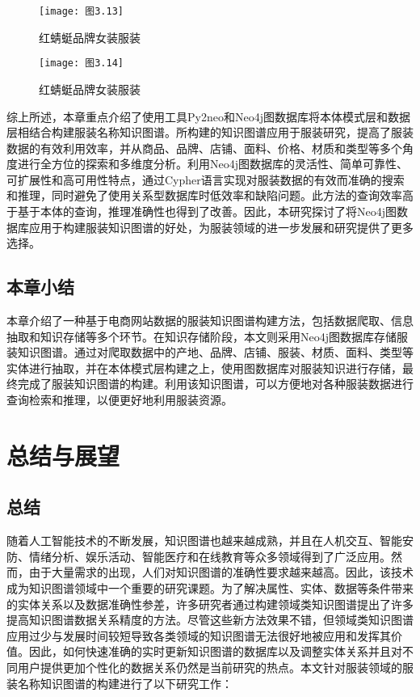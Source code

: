 \documentclass[bachelor_p]{hdu-thesis}
\begin{document}
\begin{figure}[h]
  \centering
  \texttt{[image: 图3.13]}
  \caption{红蜻蜓品牌女装服装}\label{fig:graph.313}
\end{figure}

\begin{figure}[h]
  \centering
  \texttt{[image: 图3.14]}
  \caption{红蜻蜓品牌女装服装}\label{fig:graph.314}
\end{figure}

综上所述，本章重点介绍了使用工具Py2neo和Neo4j图数据库将本体模式层和数据层相结合构建服装名称知识图谱。所构建的知识图谱应用于服装研究，提高了服装数据的有效利用效率，并从商品、品牌、店铺、面料、价格、材质和类型等多个角度进行全方位的探索和多维度分析。利用Neo4j图数据库的灵活性、简单可靠性、可扩展性和高可用性特点，通过Cypher语言实现对服装数据的有效而准确的搜索和推理，同时避免了使用关系型数据库时低效率和缺陷问题。此方法的查询效率高于基于本体的查询，推理准确性也得到了改善。因此，本研究探讨了将Neo4j图数据库应用于构建服装知识图谱的好处，为服装领域的进一步发展和研究提供了更多选择。


\section{本章小结}
本章介绍了一种基于电商网站数据的服装知识图谱构建方法，包括数据爬取、信息抽取和知识存储等多个环节。在知识存储阶段，本文则采用Neo4j图数据库存储服装知识图谱。通过对爬取数据中的产地、品牌、店铺、服装、材质、面料、类型等实体进行抽取，并在本体模式层构建之上，使用图数据库对服装知识进行存储，最终完成了服装知识图谱的构建。利用该知识图谱，可以方便地对各种服装数据进行查询检索和推理，以便更好地利用服装资源。


\chapter{总结与展望}
\section{总结}
随着人工智能技术的不断发展，知识图谱也越来越成熟，并且在人机交互、智能安防、情绪分析、娱乐活动、智能医疗和在线教育等众多领域得到了广泛应用。然而，由于大量需求的出现，人们对知识图谱的准确性要求越来越高。因此，该技术成为知识图谱领域中一个重要的研究课题。为了解决属性、实体、数据等条件带来的实体关系以及数据准确性参差，许多研究者通过构建领域类知识图谱提出了许多提高知识图谱数据关系精度的方法。尽管这些新方法效果不错，但领域类知识图谱应用过少与发展时间较短导致各类领域的知识图谱无法很好地被应用和发挥其价值。因此，如何快速准确的实时更新知识图谱的数据库以及调整实体关系并且对不同用户提供更加个性化的数据关系仍然是当前研究的热点。本文针对服装领域的服装名称知识图谱的构建进行了以下研究工作：
\end{document}

